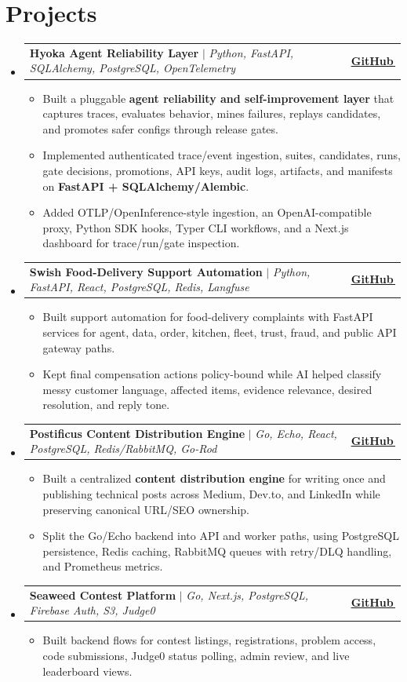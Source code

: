 \documentclass[letterpaper,11pt]{article}
\makeatletter
\newcommand{\bodyhref}[2]{\href{#1}{\underline{#2}\,\faExternalLink*}}
\newcommand{\resumeItem}[1]{\item{\fontsize{8.82pt}{9.28pt}\selectfont #1\vspace{-0.7pt}}}
\newcommand{\resumeProjectHeading}[2]{
    \item
    \begin{tabular*}{1.0\textwidth}{l@{\extracolsep{\fill}}r}
      \small#1 & \textbf{\small #2}\\
    \end{tabular*}\vspace{-4pt}
}
\newcommand{\resumeSubHeadingListStart}{\begin{itemize}[leftmargin=0.0in, label={}, itemsep=0.6pt, topsep=0pt, parsep=0pt, partopsep=0pt]}
\newcommand{\resumeSubHeadingListEnd}{\end{itemize}}
\newcommand{\resumeItemListStart}{\begin{itemize}[leftmargin=0.16in,itemsep=0.3pt,topsep=0.9pt,parsep=0pt,partopsep=0pt]}
\newcommand{\resumeItemListEnd}{\end{itemize}\vspace{-3pt}}
\makeatother
\begin{document}
\section{Projects}
\resumeSubHeadingListStart
\resumeProjectHeading
{\textbf{Hyoka Agent Reliability Layer} $|$ \emph{Python, FastAPI, SQLAlchemy, PostgreSQL, OpenTelemetry}}{\bodyhref{https://github.com/unichronic/hyoka}{GitHub}}
\resumeItemListStart
\resumeItem{Built a pluggable \textbf{agent reliability and self-improvement layer} that captures traces, evaluates behavior, mines failures, replays candidates, and promotes safer configs through release gates.}
\resumeItem{Implemented authenticated trace/event ingestion, suites, candidates, runs, gate decisions, promotions, API keys, audit logs, artifacts, and manifests on \textbf{FastAPI + SQLAlchemy/Alembic}.}
\resumeItem{Added OTLP/OpenInference-style ingestion, an OpenAI-compatible proxy, Python SDK hooks, Typer CLI workflows, and a Next.js dashboard for trace/run/gate inspection.}
\resumeItemListEnd
\resumeProjectHeading
{\textbf{Swish Food-Delivery Support Automation} $|$ \emph{Python, FastAPI, React, PostgreSQL, Redis, Langfuse}}{\bodyhref{https://github.com/unichronic/swishagent}{GitHub}}
\resumeItemListStart
\resumeItem{Built support automation for food-delivery complaints with FastAPI services for agent, data, order, kitchen, fleet, trust, fraud, and public API gateway paths.}
\resumeItem{Kept final compensation actions policy-bound while AI helped classify messy customer language, affected items, evidence relevance, desired resolution, and reply tone.}
\resumeItemListEnd
\resumeProjectHeading
{\textbf{Postificus Content Distribution Engine} $|$ \emph{Go, Echo, React, PostgreSQL, Redis/RabbitMQ, Go-Rod}}{\bodyhref{https://github.com/unichronic/postificus}{GitHub}}
\resumeItemListStart
\resumeItem{Built a centralized \textbf{content distribution engine} for writing once and publishing technical posts across Medium, Dev.to, and LinkedIn while preserving canonical URL/SEO ownership.}
\resumeItem{Split the Go/Echo backend into API and worker paths, using PostgreSQL persistence, Redis caching, RabbitMQ queues with retry/DLQ handling, and Prometheus metrics.}
\resumeItemListEnd
\resumeProjectHeading
{\textbf{Seaweed Contest Platform} $|$ \emph{Go, Next.js, PostgreSQL, Firebase Auth, S3, Judge0}}{\bodyhref{https://github.com/unichronic/seaweed-fe}{GitHub}}
\resumeItemListStart
\resumeItem{Built backend flows for contest listings, registrations, problem access, code submissions, Judge0 status polling, admin review, and live leaderboard views.}
\resumeItemListEnd
\resumeSubHeadingListEnd
\end{document}
